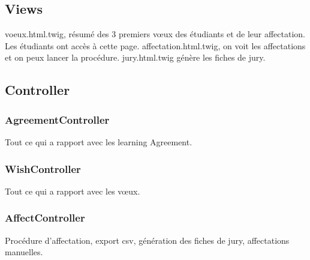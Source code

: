 \subsection{Views}
voeux.html.twig, résumé des 3 premiers vœux des étudiants et de leur affectation. Les étudiants ont accès à cette page.
affectation.html.twig, on voit les affectations et on peux lancer la procédure.
jury.html.twig génère les fiches de jury.

\subsection{Controller}
\subsubsection{AgreementController}
Tout ce qui a rapport avec les learning Agreement.

\subsubsection{WishController}
Tout ce qui a rapport avec les vœux.

\subsubsection{AffectController}
Procédure d'affectation, export csv, génération des fiches de jury, affectations manuelles.